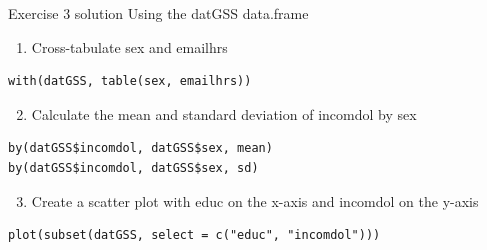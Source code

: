 \documentclass[table,smaller]{beamer}
\begin{document}
\begin{frame}[fragile,label=sec-9-4]{Exercise 3 solution}
 Using the datGSS data.frame

\begin{enumerate}
\setcounter{enumi}{0}
\item Cross-tabulate sex and emailhrs
\end{enumerate}
\begin{verbatim}
with(datGSS, table(sex, emailhrs))
\end{verbatim}

\begin{enumerate}
\setcounter{enumi}{1}
\item Calculate the mean and standard deviation of incomdol by sex
\end{enumerate}
\begin{verbatim}
by(datGSS$incomdol, datGSS$sex, mean)
by(datGSS$incomdol, datGSS$sex, sd)
\end{verbatim}

\begin{enumerate}
\setcounter{enumi}{2}
\item Create a scatter plot with educ on the x-axis and incomdol on the y-axis
\end{enumerate}
\begin{verbatim}
plot(subset(datGSS, select = c("educ", "incomdol")))
\end{verbatim}
\end{frame}
\end{document}
